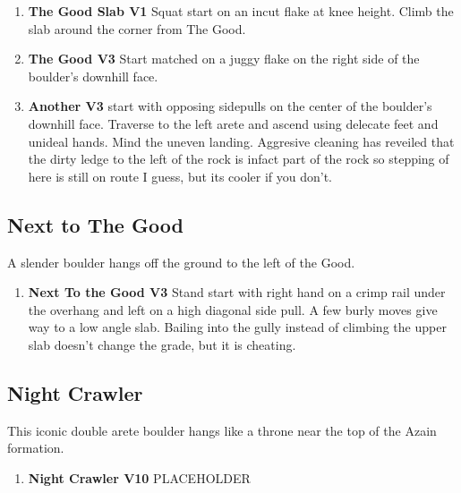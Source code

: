 \begin{enumerate}[]
	\item\label{rt:The Good Slab} \colorbox{green!20}{\textbf{The Good Slab V1    } }
	\newline Squat start on an incut flake at knee height. Climb the slab around the corner from The Good.\
	\item\label{rt:The Good} \colorbox{green!20}{\textbf{The Good V3    } }
	\newline Start matched on a juggy flake on the right side of the boulder's downhill face.\
	\item\label{rt:Another} \colorbox{green!20}{\textbf{Another V3   \warn } }
	\newline start with opposing sidepulls on the center of the boulder's downhill face. Traverse to the left arete and ascend using delecate feet and unideal hands. Mind the uneven landing. Aggresive cleaning has reveiled that the dirty ledge to the left of the rock is infact part of the rock so stepping of here is still on route I guess, but its cooler if you don't.\
\end{enumerate}
\subsection*{Next to The Good}\label{bf:Next to The Good}
A slender boulder hangs off the ground to the left of the Good.

\begin{enumerate}[resume]
	\item\label{rt:Next To the Good} \colorbox{green!20}{\textbf{Next To the Good V3   \warn } }
	\newline Stand start with right hand on a crimp rail under the overhang and left on a high diagonal side pull. A few burly moves give way to a low angle slab. Bailing into the gully instead of climbing the upper slab doesn't change the grade, but it is cheating.\
\end{enumerate}
\subsection*{Night Crawler}\label{bf:Night Crawler}
This iconic double arete boulder hangs like a throne near the top of the Azain formation.

\begin{enumerate}[resume]
	\item\label{rt:Night Crawler} \colorbox{red!20}{\textbf{Night Crawler V10  } }
	\newline PLACEHOLDER\
\end{enumerate}
